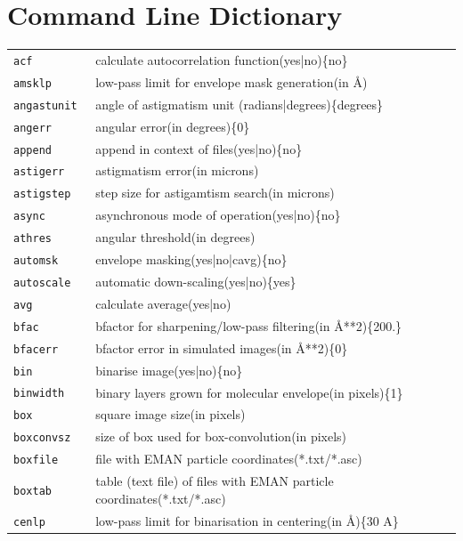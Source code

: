 \documentclass[a4paper,11pt]{article}
\begin{document}
\section{Command Line Dictionary}
\begin{tabular}{ll}
\texttt{acf             }&{ calculate autocorrelation function(yes|no)\{no\}}\\
\texttt{amsklp          }&{ low-pass limit for envelope mask generation(in \AA{})}\\
\texttt{angastunit      }&{ angle of astigmatism unit (radians|degrees)\{degrees\}}\\
\texttt{angerr          }&{ angular error(in degrees)\{0\}}\\
\texttt{append          }&{ append in context of files(yes|no)\{no\}}\\
\texttt{astigerr        }&{ astigmatism error(in microns)}\\
\texttt{astigstep       }&{ step size for astigamtism search(in microns)}\\
\texttt{async           }&{ asynchronous mode of operation(yes|no)\{no\}}\\
\texttt{athres          }&{ angular threshold(in degrees)}\\
\texttt{automsk         }&{ envelope masking(yes|no|cavg)\{no\}}\\
\texttt{autoscale       }&{ automatic down-scaling(yes|no)\{yes\}}\\
\texttt{avg             }&{ calculate average(yes|no)}\\
\texttt{bfac            }&{ bfactor for sharpening/low-pass filtering(in \AA{}**2)\{200.\}}\\
\texttt{bfacerr         }&{ bfactor error in simulated images(in \AA{}**2)\{0\}}\\
\texttt{bin             }&{ binarise image(yes|no)\{no\}}\\
\texttt{binwidth        }&{ binary layers grown for molecular envelope(in pixels)\{1\}}\\
\texttt{box             }&{ square image size(in pixels)}\\
\texttt{boxconvsz       }&{ size of box used for box-convolution(in pixels)}\\
\texttt{boxfile         }&{ file with EMAN particle coordinates(*.txt/*.asc)}\\
\texttt{boxtab          }&{ table (text file) of files with EMAN particle coordinates(*.txt/*.asc)}\\
\texttt{cenlp           }&{ low-pass limit for binarisation in centering(in \AA{})\{30 A\}}\\

\end{tabular}
\end{document}
